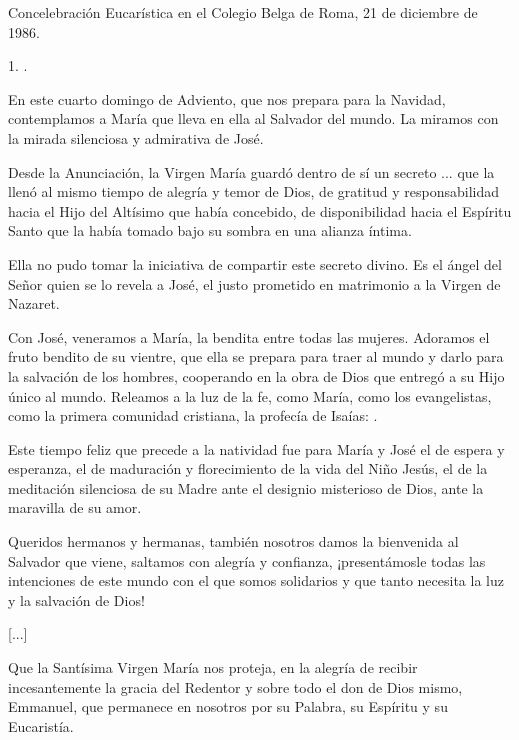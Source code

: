 \begin{body}
	Concelebración Eucarística en el Colegio Belga de Roma, 21 de diciembre de 1986.
	
	\begin{body}
		1. .
		
		En este cuarto domingo de Adviento, que nos prepara para la Navidad, contemplamos a María que lleva en ella al Salvador del mundo. La miramos con la mirada silenciosa y admirativa de José.
		
		Desde la Anunciación, la Virgen María guardó dentro de sí un secreto ... que la llenó al mismo tiempo de alegría y temor de Dios, de gratitud y responsabilidad hacia el Hijo del Altísimo que había concebido, de disponibilidad hacia el Espíritu Santo que la había tomado bajo su sombra en una alianza íntima.
		
		Ella no pudo tomar la iniciativa de compartir este secreto divino. Es el ángel del Señor quien se lo revela a José, el justo prometido en matrimonio a la Virgen de Nazaret.
		
		Con José, veneramos a María, la bendita entre todas las mujeres. Adoramos el fruto bendito de su vientre, que ella se prepara para traer al mundo y darlo para la salvación de los hombres, cooperando en la obra de Dios que entregó a su Hijo único al mundo. Releamos a la luz de la fe, como María, como los evangelistas, como la primera comunidad cristiana, la profecía de Isaías: .
		
		Este tiempo feliz que precede a la natividad fue para María y José el de espera y esperanza, el de maduración y florecimiento de la vida del Niño Jesús, el de la meditación silenciosa de su Madre ante el designio misterioso de Dios, ante la maravilla de su amor.
		
		Queridos hermanos y hermanas, también nosotros damos la bienvenida al Salvador que viene, saltamos con alegría y confianza, ¡presentámosle todas las intenciones de este mundo con el que somos solidarios y que tanto necesita la luz y la salvación de Dios!
		
		{[}...{]}
		
		Que la Santísima Virgen María nos proteja, en la alegría de recibir incesantemente la gracia del Redentor y sobre todo el don de Dios mismo, Emmanuel, que permanece en nosotros por su Palabra, su Espíritu y su Eucaristía.
	\end{body}
	

\end{body}
